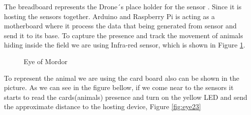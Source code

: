 \documentclass[12pt]{article}
\begin{document}
The breadboard represents the Drone´s place holder for the sensor . Since it is hosting the sensors together. Arduino and Raspberry Pi is acting as a motherboard where it process the data that being generated from sensor and send it to its base. To capture the presence and track the movement of animals hiding inside the field we are using Infra-red sensor, which is shown in Figure \ref{fig::eye1}. 

\begin{figure}[!h]
\caption{Eye of Mordor}
\label{fig::eye1}
\end{figure}

To represent the animal we are using the card board also can be shown in the picture. As we can see in the figure bellow, if we come near to the sensors it starts to read the cards(animals) presence and turn on the yellow LED and send the approximate distance to the hosting device, Figure \ref{fig:eye23}
\end{document}
